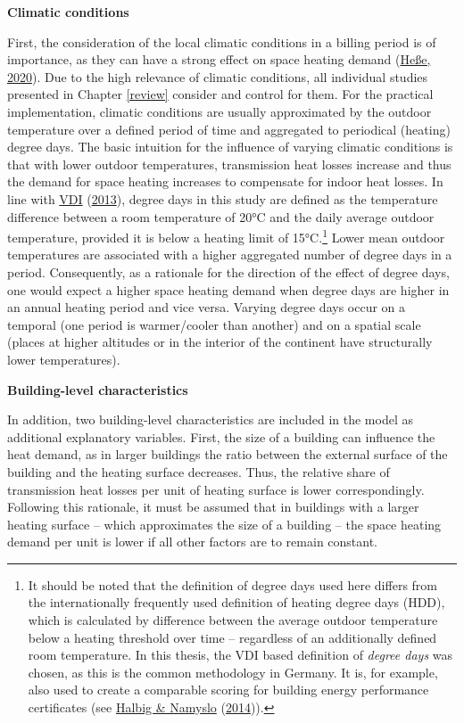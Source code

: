 \documentclass[12pt,twoside]{reedthesis}
\begin{document}
\textbf{Climatic conditions}

First, the consideration of the local climatic conditions in a billing period is of importance, as they can have a strong effect on space heating demand (\protect\hyperlink{ref-hesse20}{Heße, 2020}). Due to the high relevance of climatic conditions, all individual studies presented in Chapter \ref{review} consider and control for them. For the practical implementation, climatic conditions are usually approximated by the outdoor temperature over a defined period of time and aggregated to periodical (heating) degree days. The basic intuition for the influence of varying climatic conditions is that with lower outdoor temperatures, transmission heat losses increase and thus the demand for space heating increases to compensate for indoor heat losses. In line with \protect\hyperlink{ref-vdi13}{VDI} (\protect\hyperlink{ref-vdi13}{2013}), degree days in this study are defined as the temperature difference between a room temperature of 20°C and the daily average outdoor temperature, provided it is below a heating limit of 15°C.\footnote{It should be noted that the definition of degree days used here differs from the internationally frequently used definition of heating degree days (HDD), which is calculated by difference between the average outdoor temperature below a heating threshold over time -- regardless of an additionally defined room temperature. In this thesis, the VDI based definition of \emph{degree days} was chosen, as this is the common methodology in Germany. It is, for example, also used to create a comparable scoring for building energy performance certificates (see \protect\hyperlink{ref-halbig_namyslo14}{Halbig \& Namyslo} (\protect\hyperlink{ref-halbig_namyslo14}{2014})).} Lower mean outdoor temperatures are associated with a higher aggregated number of degree days in a period. Consequently, as a rationale for the direction of the effect of degree days, one would expect a higher space heating demand when degree days are higher in an annual heating period and vice versa. Varying degree days occur on a temporal (one period is warmer/cooler than another) and on a spatial scale (places at higher altitudes or in the interior of the continent have structurally lower temperatures).

\textbf{Building-level characteristics}

In addition, two building-level characteristics are included in the model as additional explanatory variables. First, the size of a building can influence the heat demand, as in larger buildings the ratio between the external surface of the building and the heating surface decreases. Thus, the relative share of transmission heat losses per unit of heating surface is lower correspondingly. Following this rationale, it must be assumed that in buildings with a larger heating surface -- which approximates the size of a building -- the space heating demand per unit is lower if all other factors are to remain constant.
\end{document}
